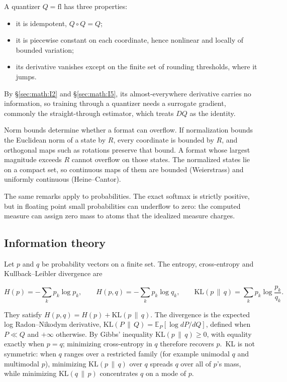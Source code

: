 A quantizer \(Q = \mathrm{fl}\) has three properties:

\begin{itemize}
\tightlist
\item
  it is idempotent, \(Q \circ Q = Q\);
\item
  it is piecewise constant on each coordinate, hence nonlinear and
  locally of bounded variation;
\item
  its derivative vanishes except on the finite set of rounding
  thresholds, where it jumps.
\end{itemize}

By \S\ref{sec:math:I2} and \S\ref{sec:math:I5}, its almost-everywhere derivative carries no
information, so training through a quantizer needs a surrogate gradient,
commonly the straight-through estimator, which treats \(DQ\) as the
identity.

Norm bounds determine whether a format can overflow. If normalization
bounds the Euclidean norm of a state by \(R\), every coordinate is bounded
by \(R\), and orthogonal maps such as rotations preserve that bound. A
format whose largest magnitude exceeds \(R\) cannot overflow on those
states. The normalized states lie on a compact set, so continuous maps
of them are bounded (Weierstrass) and uniformly continuous
(Heine--Cantor).

The same remarks apply to probabilities. The exact softmax is strictly
positive, but in floating point small probabilities can underflow to
zero: the computed measure can assign zero mass to atoms that the
idealized measure charges.

\subsection{Information theory}\label{sec:math:I10}

Let \(p\) and \(q\) be probability vectors on a finite set. The entropy,
cross-entropy and Kullback--Leibler divergence are

\[
H(p) = -\sum_k p_k \log p_k, \qquad H(p, q) = -\sum_k p_k \log q_k, \qquad \mathrm{KL}(p \,\|\, q) = \sum_k p_k \log \frac{p_k}{q_k}.
\]

They satisfy \(H(p, q) = H(p) + \mathrm{KL}(p \,\|\, q)\). The divergence is the expected
log Radon--Nikodym derivative, \(\mathrm{KL}(P \,\|\, Q) = \mathbb{E}_P[\log dP/dQ]\), defined
when \(P \ll Q\) and \(+\infty\) otherwise. By Gibbs' inequality \(\mathrm{KL}(p \,\|\, q) \ge 0\), with
equality exactly when \(p = q\); minimizing cross-entropy in \(q\) therefore
recovers \(p\).~KL is not symmetric: when \(q\) ranges over a restricted family (for
example unimodal \(q\) and multimodal \(p\)), minimizing \(\mathrm{KL}(p \,\|\, q)\) over \(q\) spreads \(q\)
over all of \(p\)'s mass, while minimizing \(\mathrm{KL}(q \,\|\, p)\) concentrates \(q\) on a mode
of \(p\).


